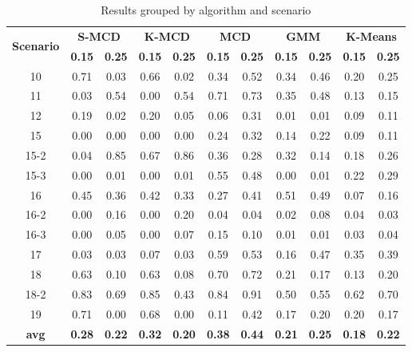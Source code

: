 \documentclass[review]{elsarticle}
\begin{document}
\begin{table}[h!]
  \centering
  \scriptsize
  \caption{Results grouped by algorithm and scenario}
  \label{tab:tab02}
  \begin{tabular}{ c|c c|c c|c c|c c|c c }
	\toprule
	\multirow{2}{*}{\textbf{Scenario}}   &\multicolumn{2}{c}{\textbf{S-MCD}} &\multicolumn{2}{c}{\textbf{K-MCD}} &\multicolumn{2}{c}{\textbf{MCD}} &\multicolumn{2}{c}{\textbf{GMM}} &\multicolumn{2}{c}{\textbf{K-Means}}\\ 
			\hhline{~----------}
			&\textbf{0.15} &\textbf{0.25} &\textbf{0.15} &\textbf{0.25} &\textbf{0.15} &\textbf{0.25} &\textbf{0.15} &\textbf{0.25} &\textbf{0.15} &\textbf{0.25}\\
	\midrule
		10 &\color{red} 0.71 & 0.03 & 0.66 & 0.02 & 0.34 & 0.52 & 0.34 & 0.46 & 0.20 & 0.25 \\ \hline
		11 & 0.03 & 0.54 & 0.00 & 0.54 & 0.71 &\color{red} 0.73 & 0.35 & 0.48 & 0.13 & 0.15 \\ \hline
		12 & 0.19 & 0.02 & 0.20 & 0.05 & 0.06 &\color{red} 0.31 & 0.01 & 0.01 & 0.09 & 0.11 \\ \hline
		15 & 0.00 & 0.00 & 0.00 & 0.00 & 0.24 &\color{red} 0.32 & 0.14 & 0.22 & 0.09 & 0.11 \\ \hline
		15-2 & 0.04 & 0.85 & 0.67 &\color{red} 0.86 & 0.36 & 0.28 & 0.32 & 0.14 & 0.18 & 0.26 \\ \hline
		15-3 & 0.00 & 0.01 & 0.00 & 0.01 &\color{red} 0.55 & 0.48 & 0.00 & 0.01 & 0.22 & 0.29 \\ \hline
		16 & 0.45 & 0.36 & 0.42 & 0.33 & 0.27 & 0.41 &\color{red} 0.51 & 0.49 & 0.07 & 0.16 \\ \hline
		16-2 & 0.00 & 0.16 & 0.00 &\color{red} 0.20 & 0.04 & 0.04 & 0.02 & 0.08 & 0.04 & 0.03 \\ \hline
		16-3 & 0.00 & 0.05 & 0.00 & 0.07 &\color{red} 0.15 & 0.10 & 0.01 & 0.01 & 0.03 & 0.04 \\ \hline
		17 & 0.03 & 0.03 & 0.07 & 0.03 &\color{red} 0.59 & 0.53 & 0.16 & 0.47 & 0.35 & 0.39 \\ \hline
		18 & 0.63 & 0.10 & 0.63 & 0.08 & 0.70 &\color{red} 0.72 & 0.21 & 0.17 & 0.13 & 0.20 \\ \hline
		18-2 & 0.83 & 0.69 & 0.85 & 0.43 & 0.84 &\color{red} 0.91 & 0.50 & 0.55 & 0.62 & 0.70 \\ \hline
		19 &\color{red} 0.71 & 0.00 & 0.68 & 0.00 & 0.11 & 0.42 & 0.17 & 0.20 & 0.20 & 0.17 \\ \hline
		\rowcolor{Gray} \textbf{avg} & \textbf{0.28} & \textbf{0.22} & \textbf{0.32} & \textbf{0.20} & \textbf{0.38} &\color{red} \textbf{0.44} & \textbf{0.21} & \textbf{0.25} & \textbf{0.18} & \textbf{0.22} \\ 
    \bottomrule
  \end{tabular}
\end{table}
\end{document}
